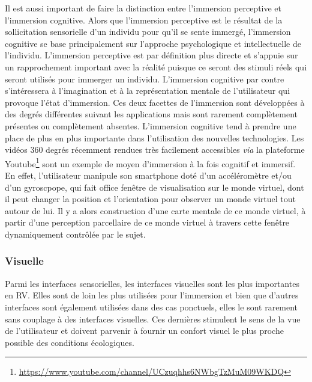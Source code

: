 Il est aussi important de faire la distinction entre l'immersion perceptive et l'immersion cognitive. Alors que l'immersion perceptive est le résultat de la sollicitation sensorielle d'un individu pour qu'il se sente immergé, l'immersion cognitive se base principalement sur l'approche psychologique et intellectuelle de l'individu. L'immersion perceptive est par définition plus directe et s'appuie sur un rapprochement important avec la réalité puisque ce seront des stimuli réels qui seront utilisés pour immerger un individu. L'immersion cognitive par contre s'intéressera à l'imagination et à la représentation mentale de l'utilisateur qui provoque l'état d'immersion. Ces deux facettes de l'immersion sont développées à des degrés différentes suivant les applications mais sont rarement complètement présentes ou complètement absentes. L'immersion cognitive tend à prendre une place de plus en plus importante dans l'utilisation des nouvelles technologies. Les vidéos 360 degrés récemment rendues très facilement accessibles \textit{via} la plateforme Youtube\footnote{\url{https://www.youtube.com/channel/UCzuqhhs6NWbgTzMuM09WKDQ}} sont un exemple de moyen d'immersion à la fois cognitif et immersif. En effet, l'utilisateur  manipule son smartphone doté d'un accéléromètre et/ou d'un gyroscpope, qui fait office fenêtre de visualisation sur le monde virtuel, dont il peut changer la position et l'orientation pour observer un monde virtuel tout autour de lui. Il y a alors construction d'une carte mentale de ce monde virtuel, à partir d'une perception parcellaire de ce monde virtuel à travers cette fenêtre dynamiquement contrôlée par le sujet.

\subsubsection{Visuelle}\label{immersion_visuelle}

Parmi les interfaces sensorielles, les interfaces visuelles sont les plus importantes en RV. Elles sont de loin les plus utilisées pour l'immersion et bien que d'autres interfaces sont également utilisées dans des cas ponctuels, elles le sont rarement sans couplage à des interfaces visuelles. Ces dernières stimulent le sens de la vue de l'utilisateur et doivent parvenir à fournir un confort visuel le plus proche possible des conditions écologiques.

 \label{stereo_3d}

